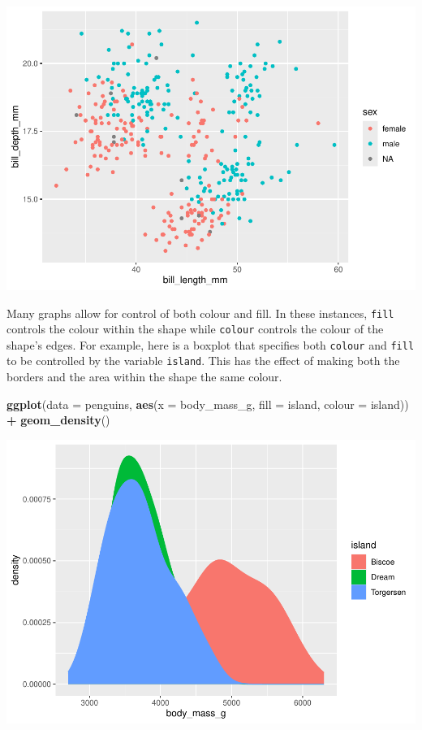 \documentclass[
]{book}
\newenvironment{Shaded}{\begin{snugshade}}{\end{snugshade}}
\newcommand{\AttributeTok}[1]{\textcolor[rgb]{0.13,0.29,0.53}{#1}}
\newcommand{\FunctionTok}[1]{\textcolor[rgb]{0.13,0.29,0.53}{\textbf{#1}}}
\newcommand{\NormalTok}[1]{#1}
\newcommand{\SpecialCharTok}[1]{\textcolor[rgb]{0.81,0.36,0.00}{\textbf{#1}}}
\begin{document}
\includegraphics{_main_files/figure-latex/unnamed-chunk-58-1.pdf}

Many graphs allow for control of both colour and fill. In these instances, \texttt{fill} controls the colour within the shape while \texttt{colour} controls the colour of the shape's edges. For example, here is a boxplot that specifies both \texttt{colour} and \texttt{fill} to be controlled by the variable \texttt{island}. This has the effect of making both the borders and the area within the shape the same colour.

\begin{Shaded}
\begin{Highlighting}[]
\FunctionTok{ggplot}\NormalTok{(}\AttributeTok{data =}\NormalTok{ penguins, }\FunctionTok{aes}\NormalTok{(}\AttributeTok{x =}\NormalTok{ body\_mass\_g, }\AttributeTok{fill =}\NormalTok{ island, }\AttributeTok{colour =}\NormalTok{ island)) }\SpecialCharTok{+} 
  \FunctionTok{geom\_density}\NormalTok{()}
\end{Highlighting}
\end{Shaded}

\includegraphics{_main_files/figure-latex/unnamed-chunk-59-1.pdf}
\end{document}
